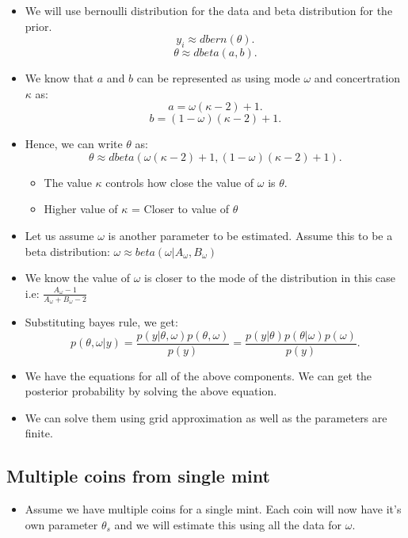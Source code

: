 \documentclass{article}
\begin{document}
    \begin{itemize}
        \item We will use bernoulli distribution for the data and beta distribution for the prior. \[
        y_{i} \approx dbern(\theta) 
        .\] 
        \[
            \theta \approx dbeta(a, b)
        .\] 
        \item We know that $a$ and $b$ can be represented as using mode $\omega$ and concertration $\kappa$ as:
            \[
                a = \omega(\kappa-2)+1 
            .\] 
            \[
                b = (1-\omega)(\kappa - 2) + 1 
            .\] 
        \item Hence, we can write $\theta$ as:
            \[
                \theta \approx dbeta(\omega(\kappa-2)+1, (1-\omega)(\kappa - 2) + 1)
            .\] 
        \begin{itemize}
            \item The value $\kappa$ controls how close the value of  $\omega$ is  $\theta$.
            \item Higher value of $\kappa$ = Closer to value of $\theta$
        \end{itemize}
        \item Let us assume $\omega$ is another parameter to be estimated. Assume this to be a beta distribution: $\omega \approx beta(\omega | A_{\omega}, B{_\omega})$
        \item We know the value of $\omega$ is closer to the mode of the distribution in this case i.e: $\frac{A_{\omega}-1}{A_{\omega}+B_{\omega}-2}$
        \item Substituting bayes rule, we get:
            \[
                p(\theta, \omega | y) = \frac{p(y | \theta, \omega) p(\theta, \omega)}{p(y)}            
                = \frac{p(y|\theta)p(\theta|\omega)p(\omega)}{p(y)}
            .\] 
        \item We have the equations for all of the above components. We can get the posterior probability by solving the above equation.
        \item We can solve them using grid approximation as well as the parameters are finite. 
    \end{itemize}

    \subsection{Multiple coins from single mint} 
    \begin{itemize}
        \item Assume we have multiple coins for a single mint. Each coin will now have it's own parameter $\theta_{s}$ and we will estimate this using all the data for $\omega$. 
    \end{itemize}
\end{document}
